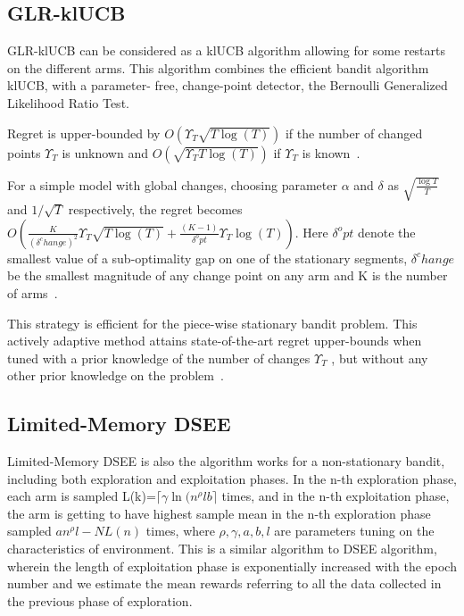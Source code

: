 \subsection{GLR-klUCB}\label{subsec:glr-klucb}
GLR-klUCB can be considered as a klUCB algorithm allowing for some restarts on the different arms. This algorithm combines the efficient bandit algorithm klUCB, with a parameter- free, change-point detector, the Bernoulli Generalized Likelihood Ratio Test.
\par
Regret is upper-bounded by $ O\left(\Upsilon_T \sqrt{T \log\left(T\right)} \right)$ if the number of changed points $\Upsilon_T $ is unknown and $ O\left(\sqrt{\Upsilon_T T \log\left(T\right)} \right)$ if  $\Upsilon_T $ is known~\citep{Besson2019}.
\par
For a simple model with global changes, choosing parameter $\alpha$ and $\delta $ as $\sqrt{\frac{\log T}{T}}$ and $1/\sqrt{T}$ respectively, the regret becomes $O\left(\frac{K}{\left(\delta^change\right)^2} \Upsilon_T \sqrt{T \log\left(T\right)}+\frac{\left(K-1\right)}{\delta^opt} \Upsilon_T \log\left(T\right)\right)$.
Here $\delta^opt$ denote the smallest value of a sub-optimality gap on one of the stationary segments, $\delta^change$ be the smallest magnitude of any change point on any arm and K is the number of arms~\citep{Besson2019}.
\par
This strategy is efficient for the piece-wise stationary bandit problem.
This actively adaptive method attains state-of-the-art regret upper-bounds when tuned with a prior knowledge of the number of changes $ \Upsilon_T $ , but without any other prior knowledge on the problem~\citep{Besson2019}.

\subsection{Limited-Memory DSEE} %
Limited-Memory DSEE is also the algorithm works for a non-stationary bandit, including both exploration and exploitation phases. In the n-th exploration phase, each arm is sampled L(k)=$\lceil\gamma\ln({n^{\rho}lb}\rceil$ times, and in the n-th exploitation phase, the arm is getting to have highest sample mean in the n-th exploration phase sampled $an^{\rho}l-NL(n)$ times, where $\rho, \gamma,a,b,l$ are parameters tuning on the characteristics of environment.
\newline This is a similar algorithm to DSEE algorithm, wherein the length of exploitation phase is exponentially increased with the epoch number and we estimate the mean rewards referring to all the data collected in the previous phase of exploration.\citep{wei2018abruptly}

